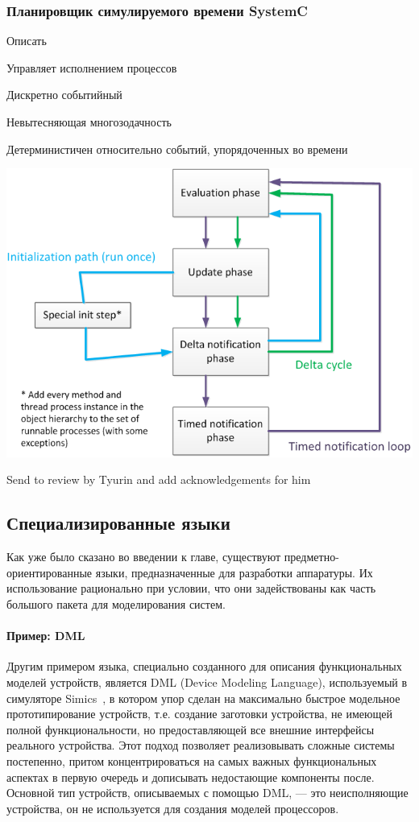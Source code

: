 \subsubsection{Планировщик симулируемого времени SystemC}

\todo Описать

Управляет исполнением процессов

Дискретно событийный

Невытесняющая многозодачность

Детерминистичен относительно событий, упорядоченных во времени

\includegraphics[width=\textwidth]{./tmp/systemc-scheduler.png}


\todo Send to review by Tyurin and add acknowledgements for him 


\subsection{Специализированные языки}

Как уже было сказано во введении к главе, существуют предметно-ориентированные языки, предназначенные для разработки аппаратуры. Их использование рационально при условии, что они задействованы как часть большого пакета для моделирования систем.

\paragraph{Пример: DML}

Другим примером языка, специально созданного для описания функциональных моделей устройств, является DML (Device Modeling Language), используемый в симуляторе Simics~\cite{dml-tutorial}, в котором упор сделан на максимально быстрое модельное прототипирование устройств, т.е. создание заготовки устройства, не имеющей полной функциональности, но предоставляющей все внешние интерфейсы реального устройства. Этот подход позволяет реализовывать сложные системы постепенно, притом концентрироваться на самых  важных функциональных аспектах в первую очередь и дописывать недостающие компоненты после. Основной тип устройств, описываемых с помощью DML, --- это неисполняющие устройства, он не используется для создания моделей процессоров.

